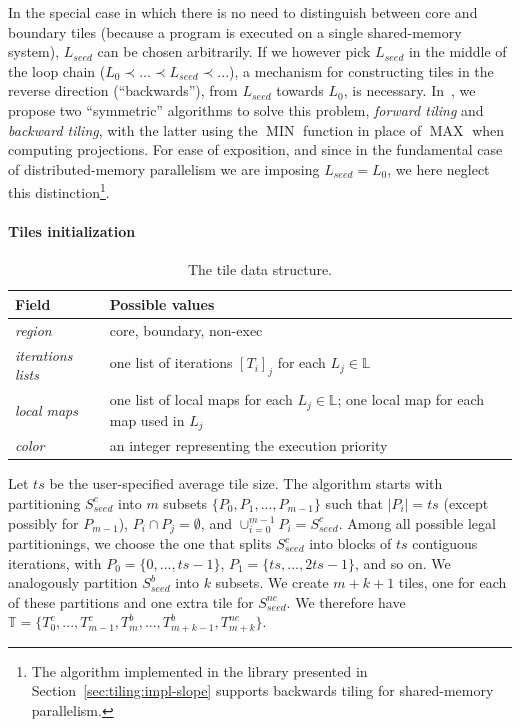 In the special case in which there is no need to distinguish between core and boundary tiles (because a program is executed on a single shared-memory system), $L_{seed}$ can be chosen arbitrarily. If we however pick $L_{seed}$ in the middle of the loop chain ($L_0 \prec ... \prec L_{seed} \prec ...$), a mechanism for constructing tiles in the reverse direction (``backwards''), from $L_{seed}$ towards $L_0$, is necessary. In~\cite{st-paper}, we propose two ``symmetric'' algorithms to solve this problem, \textit{forward tiling} and \textit{backward tiling}, with the latter using the $\operatorname{MIN}$ function in place of $\operatorname{MAX}$ when computing projections. For ease of exposition, and since in the fundamental case of distributed-memory parallelism we are imposing $L_{seed} = L_0$, we here neglect this distinction\footnote{The algorithm implemented in the library presented in Section~\ref{sec:tiling:impl-slope} supports backwards tiling for shared-memory parallelism.}. 




\paragraph{Tiles initialization}

\begin{table}[ht]
\centering
\begin{tabulary}{1.0\columnwidth}{P{2.7cm} | P{8.5cm}}
\hline
Field & Possible values \\
\hline
{\em region} & core, boundary, non-exec \\
{\em iterations lists} & one list of iterations $[T_i]_j$ for each $L_j \in \mathbb{L}$\\ 
{\em local maps} & one list of local maps for each $L_j \in \mathbb{L}$; one local map for each map used in $L_j$\\
{\em color} & an integer representing the execution priority \\ 
\hline
\end{tabulary}
\caption{The tile data structure.}
\label{table:st-tile-structure}
\end{table}

Let $ts$ be the user-specified average tile size. The algorithm starts with partitioning $S_{seed}^{c}$ into $m$ subsets $\lbrace P_0, P_1, ..., P_{m-1}\rbrace$ such that $|P_i| = ts$ (except possibly for $P_{m-1}$), $P_i \cap P_j = \emptyset$, and $\cup_{i = 0}^{m-1} P_i = S_{seed}^{c}$. Among all possible legal partitionings, we choose the one that splits $S_{seed}^c$ into blocks of $ts$ contiguous iterations, with $P_0 = \lbrace 0, ..., ts-1\rbrace$, $P_1 = \lbrace ts, ..., 2 ts - 1\rbrace$, and so on. We analogously partition $S_{seed}^{b}$ into $k$ subsets. We create $m+k+1$ tiles, one for each of these partitions and one extra tile for $S_{seed}^{ne}$. We therefore have $\mathbb{T} = \lbrace T_0^c, ..., T_{m-1}^c, T_m^{b}, ..., T_{m+k-1}^b, T_{m+k}^{ne} \rbrace$. 


